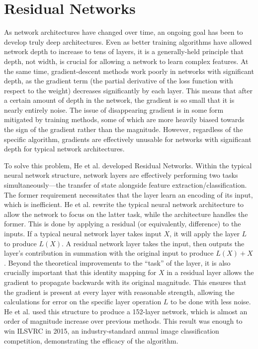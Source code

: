 \section{Residual Networks}
As network architectures have changed over time, an ongoing goal has been to develop truly deep architectures.
Even as better training algorithms have allowed network depth to increase to tens of layers, it is a generally-held principle that depth, not width, is crucial for allowing a network to learn complex features.
At the same time, gradient-descent methods work poorly in networks with significant depth, as the gradient term (the partial derivative of the loss function with respect to the weight) decreases significantly by each layer.
This means that after a certain amount of depth in the network, the gradient is so small that it is nearly entirely noise.
The issue of disappearing gradient is in some form mitigated by training methods, some of which are more heavily biased towards the sign of the gradient rather than the magnitude.
However, regardless of the specific algorithm, gradients are effectively unusable for networks with significant depth for typical network architectures.

To solve this problem, He et al. \cite{he2016deep} developed Residual Networks.
Within the typical neural network structure, network layers are effectively performing two tasks simultaneously---the transfer of state alongside feature extraction/classification.
The former requirement necessitates that the layer learn an encoding of its input, which is inefficient.
He et al. rewrite the typical neural network architecture to allow the network to focus on the latter task, while the architecture handles the former. 
This is done by applying a residual (or equivalently, difference) to the inputs.
If a typical neural network layer takes input $X$, it will apply the layer $L$ to produce $L(X)$.
A residual network layer takes the input, then outputs the layer's contribution in summation with the original input to produce $L(X) + X$.
Beyond the theoretical improvements to the ``task'' of the layer, it is also crucially important that this identity mapping for $X$ in a residual layer allows the gradient to propagate backwards with its original magnitude.
This ensures that the gradient is present at every layer with reasonable strength, allowing the calculations for error on the specific layer operation $L$ to be done with less noise.
He et al. used this structure to produce a 152-layer network, which is almost an order of magnitude increase over previous methods. 
This result was enough to win ILSVRC in 2015, an industry-standard annual image classification competition, demonstrating the efficacy of the algorithm.

